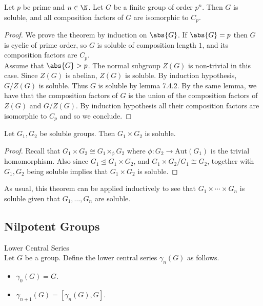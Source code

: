 \documentclass[a4paper]{article}
\begin{document}
\begin{thm}{}{} Let $p$ be prime and $n\in\N$. Let $G$ be a finite group of order $p^n$. Then $G$ is soluble, and all composition factors of $G$ are isomorphic to $C_p$. 
\begin{proof}
We prove the theorem by induction on $\abs{G}$. If $\abs{G}=p$ then $G$ is cyclic of prime order, so $G$ is soluble of composition length $1$, and its composition factors are $C_p$. \\

Assume that $\abs{G}>p$. The normal subgroup $Z(G)$ is non-trivial in this case. Since $Z(G)$ is abelian, $Z(G)$ is soluble. By induction hypothesis, $G/Z(G)$ is soluble. Thus $G$ is soluble by lemma 7.4.2. By the same lemma, we have that the composition factors of $G$ is the union of the composition factors of $Z(G)$ and $G/Z(G)$. By induction hypothesis all their composition factors are isomorphic to $C_p$ and so we conclude. 
\end{proof}
\end{thm}

\begin{thm}{}{} Let $G_1,G_2$ be soluble groups. Then $G_1\times G_2$ is soluble. 
\begin{proof}
Recall that $G_1\times G_2\cong G_1\rtimes_\phi G_2$ where $\phi:G_2\to\text{Aut}(G_1)$ is the trivial homomorphism. Also since $G_1\trianglelefteq G_1\times G_2$, and $G_1\times G_2/G_1\cong G_2$, together with $G_1,G_2$ being soluble implies that $G_1\times G_2$ is soluble. 
\end{proof}
\end{thm}

As usual, this theorem can be applied inductively to see that $G_1\times\cdots\times G_n$ is soluble given that $G_1,\dots,G_n$ are soluble. 


\subsection{Nilpotent Groups}
\begin{defn}{Lower Central Series}{}\\
Let $G$ be a group. Define the lower central series $\gamma_n(G)$ as follows. 
\begin{itemize}
\item $\gamma_0(G)=G$. 
\item $\gamma_{n+1}(G)=[\gamma_n(G),G]$. 
\end{itemize}
\end{defn}
\end{document}
